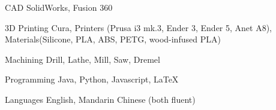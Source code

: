 


\begin{cvskills}


\cvskill
{CAD} %
{SolidWorks, Fusion 360} %


\cvskill
{3D Printing} %
{Cura, Printers (Prusa i3 mk.3, Ender 3, Ender 5, Anet A8), Materials(Silicone, PLA, ABS, PETG, wood-infused PLA)} %

\cvskill
{Machining}
{Drill, Lathe, Mill, Saw, Dremel}

\cvskill
{Programming} %
{Java, Python, Javascript, LaTeX} %

\cvskill
{Languages}
{English, Mandarin Chinese (both fluent)}


\end{cvskills}